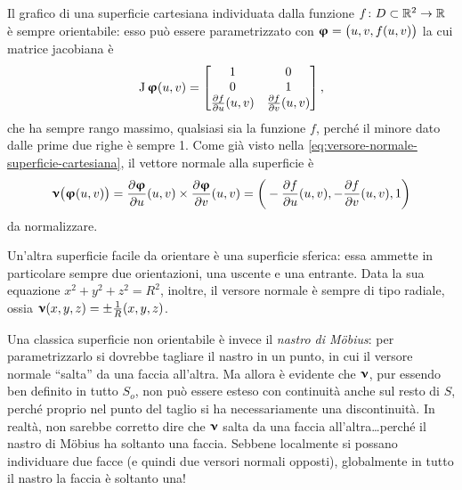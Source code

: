 \begin{osservazione} \label{o:superfici-cartesiane}
	Il grafico di una superficie cartesiana individuata dalla funzione $f\colon D\subset\mathbb{R}^2\to\mathbb{R}$ è sempre orientabile: esso può essere parametrizzato con $\bm{\upvarphi}=\big(u,v,f(u,v)\big)$ la cui matrice jacobiana è 
	\begin{equation*}
		\operatorname{J}\bm{\upvarphi}(u,v)=
		\begin{bmatrix}
			1&0\\
			0&1\\
			\frac{\partial {f}}{\partial {u}}(u,v)&\frac{\partial {f}}{\partial {v}}(u,v)
		\end{bmatrix},
	\end{equation*}
	che ha sempre rango massimo, qualsiasi sia la funzione $f$, perch\'e il minore dato dalle prime due righe è sempre 1.
	Come già visto nella \eqref{eq:versore-normale-superficie-cartesiana}, il vettore normale alla superficie è
	\begin{equation*}
		\bm{\upnu}\big(\bm{\upvarphi}(u,v)\big)=\frac{\partial {\bm{\upvarphi}}}{\partial {u}}(u,v)\times\frac{\partial {\bm{\upvarphi}}}{\partial {v}}(u,v)=\bigg(-\frac{\partial {f}}{\partial {u}}(u,v),-\frac{\partial {f}}{\partial {v}}(u,v),1\bigg)
	\end{equation*}
	da normalizzare.
\end{osservazione}
Un'altra superficie facile da orientare è una superficie sferica: essa ammette in particolare sempre due orientazioni, una uscente e una entrante.
Data la sua equazione $x^2+y^2+z^2=R^2$, inoltre, il versore normale è sempre di tipo radiale, ossia $\bm{\upnu}(x,y,z)=\pm\frac1{R}(x,y,z)$.

Una classica superficie non orientabile è invece il \emph{nastro di M\"obius}: per parametrizzarlo si dovrebbe tagliare il nastro in un punto, in cui il versore normale ``salta'' da una faccia all'altra.
Ma allora è evidente che $\bm{\upnu}$, pur essendo ben definito in tutto $S_o$, non può essere esteso con continuità anche sul resto di $S$, perch\'e proprio nel punto del taglio si ha necessariamente una discontinuità.
In realtà, non sarebbe corretto dire che $\bm{\upnu}$ salta da una faccia all'altra\dots perch\'e il nastro di M\"obius ha soltanto una faccia.
Sebbene localmente si possano individuare due facce (e quindi due versori normali opposti), globalmente in tutto il nastro la faccia è soltanto una!

